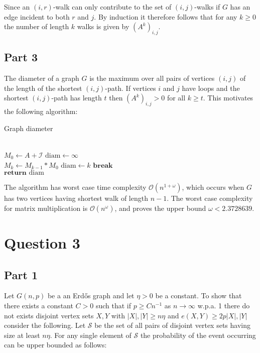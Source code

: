 \documentclass{article}
\begin{document}
Since an $(i,r)$-walk can only contribute to the set of $(i,j)$-walks if $G$ has an edge incident to both $r$ and $j$. By induction it therefore follows that for any $k\geq 0$ the number of length $k$ walks is given by $(A^k)_{i,j}$. 

\subsection*{Part 3}

The diameter of a graph $G$ is the maximum over all pairs of vertices $(i,j)$ of the length of the shortest $(i,j)$-path. If vertices $i$ and $j$ have loops and the shortest $(i,j)$-path has length $t$ then $(A^k)_{i,j} > 0$ for all $k \geq t$. This motivates the following algorithm: 

\text{}

\begin{algorithm}
\begin{algorithmic}
\caption{Graph diameter}
\\
\State $M_0 \gets A + \mathcal{I}$
\State $\text{diam} \gets \infty$ 
\\
    \State $M_k \gets M_{k-1} * M_0 $
    \State $\text{diam} \gets k$
    \State $\textbf{break}$
    \EndIf
\EndFor
\\
\State $\textbf{return }\text{diam}$
\end{algorithmic}
\end{algorithm}

The algorithm has worst case time complexity $\mathcal{O}(n^{1 + \omega})$, which occurs when $G$ has two vertices having shortest walk of length $n-1$. The worst case complexity for matrix multiplication is $\mathcal{O}(n^\omega)$, and \cite{le2014powers} proves the upper bound $\omega < 2.3728639$. 

\section*{Question 3}

\subsection*{Part 1}

Let $G(n,p)$ be a an Erdős graph and let $\eta > 0$ be a constant. To show that there exists a constant $C>0$ such that if $p \geq Cn^{-1}$ as $n \rightarrow \infty$ w.p.a. 1 there do not exists disjoint vertex sets $X,Y$ with $\left | X \right |, \left | Y \right | \geq n \eta$ and $e(X,Y) \geq 2p \left | X \right |, \left | Y \right | $ consider the following. Let $\mathcal{S}$ be the set of all pairs of disjoint vertex sets having size at least $n\eta$. For any single element of $\mathcal{S}$ the probability of the event occurring can be upper bounded as follows:
\end{document}
